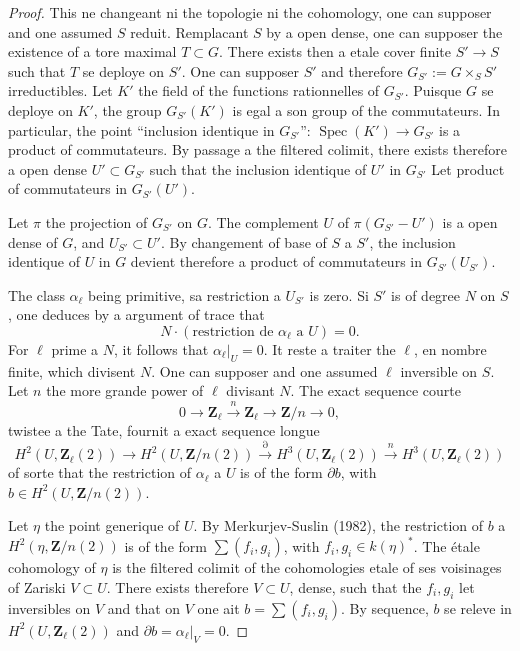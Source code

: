 \documentclass[11pt,a4paper]{article}
\theoremstyle{plain}
\theoremstyle{definition}
\DeclareMathOperator{\Spec}{Spec}
\begin{document}
\begin{proof}
This ne changeant ni the topologie ni the cohomology, one can supposer and one assumed $S$ reduit. Remplacant $S$ by a open dense, one can supposer the existence of a tore maximal $T \subset G$. There exists then a etale cover finite $S' \to S$ such that $T$ se deploye on $S'$. One can supposer $S'$ and therefore $G_{S'} := G \times_S S'$ irreductibles. Let $K'$ the field of the functions rationnelles of $G_{S'}$. Puisque $G$ se deploye on $K'$, the group $G_{S'}(K')$ is egal a son group of the commutateurs. In particular, the point ``inclusion identique in $G_{S'}$'': $\Spec(K') \to G_{S'}$ is a product of commutateurs. By passage a the filtered colimit, there exists therefore a open dense $U' \subset G_{S'}$ such that the inclusion identique of $U'$ in $G_{S'}$ Let product of commutateurs in $G_{S'}(U')$.

Let $\pi$ the projection of $G_{S'}$ on $G$. The complement $U$ of $\pi(G_{S'} - U')$ is a open dense of $G$, and $U_{S'} \subset U'$. By changement of base of $S$ a $S'$, the inclusion identique of $U$ in $G$ devient therefore a product of commutateurs in $G_{S'}(U_{S'})$.

The class $\alpha_\ell$ being primitive, sa restriction a $U_{S'}$ is zero. Si $S'$ is of degree $N$ on $S$, one deduces by a argument of trace that
\[
N \cdot (\text{restriction de } \alpha_\ell \text{ a } U) = 0.
\]
For $\ell$ prime a $N$, it follows that $\alpha_\ell|_U = 0$. It reste a traiter the $\ell$, en nombre finite, which divisent $N$. One can supposer and one assumed $\ell$ inversible on $S$. Let $n$ the more grande power of $\ell$ divisant $N$. The exact sequence courte
\[
0 \to \mathbf{Z}_\ell \xrightarrow{n} \mathbf{Z}_\ell \to \mathbf{Z}/n \to 0,
\]
twistee a the Tate, fournit a exact sequence longue
\[
H^2(U, \mathbf{Z}_\ell(2)) \to H^2(U, \mathbf{Z}/n(2)) \xrightarrow{\partial} H^3(U, \mathbf{Z}_\ell(2)) \xrightarrow{n} H^3(U, \mathbf{Z}_\ell(2))
\]
of sorte that the restriction of $\alpha_\ell$ a $U$ is of the form $\partial b$, with $b \in H^2(U, \mathbf{Z}/n(2))$.

Let $\eta$ the point generique of $U$. By Merkurjev-Suslin (1982), the restriction of $b$ a $H^2(\eta, \mathbf{Z}/n(2))$ is of the form $\sum (f_i, g_i)$, with $f_i, g_i \in k(\eta)^*$. The étale cohomology of $\eta$ is the filtered colimit of the cohomologies etale of ses voisinages of Zariski $V \subset U$. There exists therefore $V \subset U$, dense, such that the $f_i, g_i$ let inversibles on $V$ and that on $V$ one ait $b = \sum (f_i, g_i)$. By sequence, $b$ se releve in $H^2(U, \mathbf{Z}_\ell(2))$ and $\partial b = \alpha_\ell|_V = 0$.
\end{proof}
\end{document}
